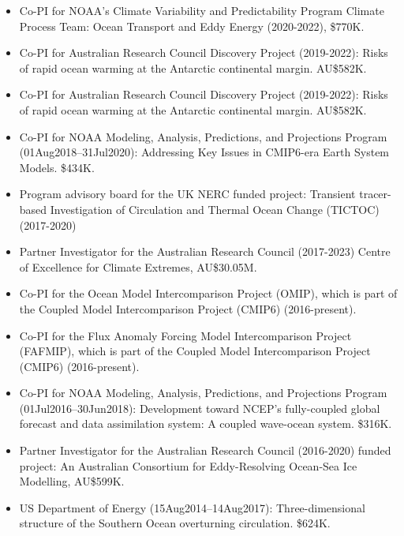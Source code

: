\documentclass{article}
\begin{document}
\begin{itemize}[leftmargin=*]

\item Co-PI for NOAA's Climate Variability and Predictability Program Climate Process Team: Ocean Transport and Eddy Energy (2020-2022),
\$770K.

\item Co-PI for Australian Research Council Discovery Project (2019-2022): Risks of rapid ocean warming at the Antarctic continental margin. AU\$582K.

\item Co-PI for Australian Research Council Discovery Project (2019-2022): Risks of rapid ocean warming at the Antarctic continental margin. AU\$582K.

\item Co-PI for NOAA Modeling, Analysis, Predictions, and Projections Program (01Aug2018--31Jul2020): Addressing Key Issues in CMIP6-era Earth System Models. \$434K.
    
\item Program advisory board for the UK NERC funded project: Transient tracer-based Investigation of Circulation and Thermal Ocean Change (TICTOC) (2017-2020)

\item Partner Investigator for the Australian Research Council (2017-2023) Centre of Excellence for Climate Extremes, AU\$30.05M.
  
\item Co-PI for the Ocean Model Intercomparison Project (OMIP), which is part of the Coupled Model Intercomparison Project (CMIP6) (2016-present).    

\item Co-PI for the Flux Anomaly Forcing Model Intercomparison Project (FAFMIP), which is part of the Coupled Model Intercomparison Project (CMIP6) (2016-present).    

\item Co-PI for NOAA Modeling, Analysis, Predictions, and Projections Program (01Jul2016--30Jun2018): Development toward NCEP's fully-coupled global forecast and data assimilation system: A coupled wave-ocean
system.  \$316K.

\item Partner Investigator for the  Australian Research Council (2016-2020) funded project: An Australian Consortium for Eddy-Resolving Ocean-Sea Ice Modelling, AU\$599K.

\item US Department of Energy (15Aug2014--14Aug2017): Three-dimensional structure of the Southern Ocean overturning
circulation.  \$624K.


\end{itemize}
\end{document}
